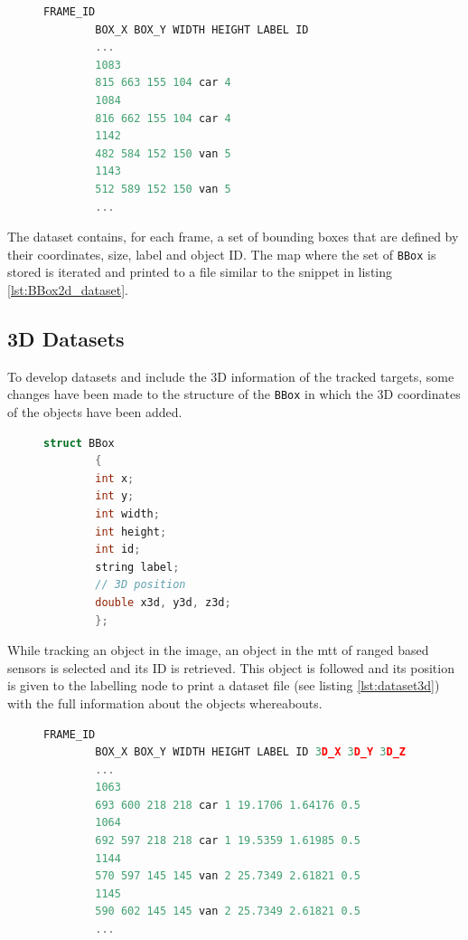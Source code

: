 \begin{figure}
	\begin{center}
		\begin{lstlisting}[label={lst:BBox2d_dataset}, caption={2D dataset example snippet},language=c++]
		FRAME_ID 
		BOX_X BOX_Y WIDTH HEIGHT LABEL ID
		...
		1083
		815 663 155 104 car 4
		1084
		816 662 155 104 car 4
		1142
		482 584 152 150 van 5
		1143
		512 589 152 150 van 5
		...\end{lstlisting}
	\end{center}
\end{figure}

The dataset contains, for each frame, a set of bounding boxes that are defined by their coordinates, size, label and object ID. The map where the set of \texttt{BBox} is stored is iterated and printed to a file similar to the snippet in listing \ref{lst:BBox2d_dataset}.


\subsection{3D Datasets}

To develop datasets and include the 3D information of the tracked targets, some changes have been made to the structure of the \texttt{BBox} in which the 3D coordinates of the objects have been added.

\begin{figure}
	\begin{center}
		\begin{lstlisting}[label={lst:bbox3d}, caption={BBox struct definition with 3D capabilities},language=c++]
		struct BBox
		{
		int x;
		int y;
		int width;
		int height;
		int id;
		string label;
		// 3D position
		double x3d, y3d, z3d;
		};		\end{lstlisting}
	\end{center}
\end{figure}

While tracking an object in the image, an object in the \gls{mtt} of ranged based sensors is selected and its ID is retrieved. This object is followed and its position is given to the labelling node to print a dataset file (see listing \ref{lst:dataset3d}) with the full information about the objects whereabouts.

\begin{figure}
	\begin{center}
		\begin{lstlisting}[label={lst:dataset3d}, caption={Snippet of the dataset with 3D capabilities},language=c++]
		FRAME_ID
		BOX_X BOX_Y WIDTH HEIGHT LABEL ID 3D_X 3D_Y 3D_Z
		...
		1063
		693 600 218 218 car 1 19.1706 1.64176 0.5
		1064
		692 597 218 218 car 1 19.5359 1.61985 0.5
		1144
		570 597 145 145 van 2 25.7349 2.61821 0.5
		1145
		590 602 145 145 van 2 25.7349 2.61821 0.5
		...		\end{lstlisting}
	\end{center}
\end{figure}

